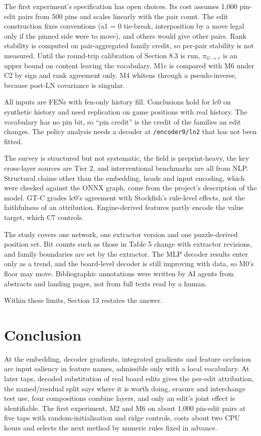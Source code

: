 \documentclass[conference]{IEEEtran}
\begin{document}
The first experiment's specification has open choices. Its cost assumes 1,000 pin-edit pairs from 500 pins and scales linearly with the pair count. The edit construction fixes conventions (a1 = 0 tie-break, interposition by a move legal only if the pinned side were to move), and others would give other pairs. Rank stability is computed on pair-aggregated family credit, so per-pair stability is not measured. Until the round-trip calibration of Section 8.3 is run, $\pi_{G\to r}$ is an upper bound on content leaving the vocabulary. M1c is compared with M6 under C2 by sign and rank agreement only. M4 whitens through a pseudo-inverse, because post-LN covariance is singular.

All inputs are FENs with fen-only history fill. Conclusions hold for lc0 on synthetic history and need replication on game positions with real history. The vocabulary has no pin bit, so ``pin credit'' is the credit of the families an edit changes. The policy analysis needs a decoder at \texttt{/\allowbreak{}encoder9/\allowbreak{}ln2} that has not been fitted.

The survey is structured but not systematic, the field is preprint-heavy, the key cross-layer sources are Tier 2, and interventional benchmarks are all from NLP. Structural claims other than the embedding, heads and input encoding, which were checked against the ONNX graph, come from the project's description of the model. GT-C grades lc0's agreement with Stockfish's rule-level effects, not the faithfulness of an attribution. Engine-derived features partly encode the value target, which C7 controls.

The study covers one network, one extractor version and one puzzle-derived position set. Bit counts such as those in Table 5 change with extractor revisions, and family boundaries are set by the extractor. The MLP decoder results enter only as a trend, and the board-level decoder is still improving with data, so M0's floor may move. Bibliographic annotations were written by AI agents from abstracts and landing pages, not from full texts read by a human.

Within these limits, Section 13 restates the answer.

\section{Conclusion}\label{sec:13}
At the embedding, decoder gradients, integrated gradients and feature occlusion are input saliency in feature names, admissible only with a local vocabulary. At later taps, decoded substitution of real board edits gives the per-edit attribution, the named/\allowbreak{}residual split says where it is worth doing, erasure and interchange test use, four compositions combine layers, and only an edit's joint effect is identifiable. The first experiment, M2 and M6 on about 1,000 pin-edit pairs at five taps with random-initialisation and ridge controls, costs about two CPU hours and selects the next method by numeric rules fixed in advance.
\end{document}
